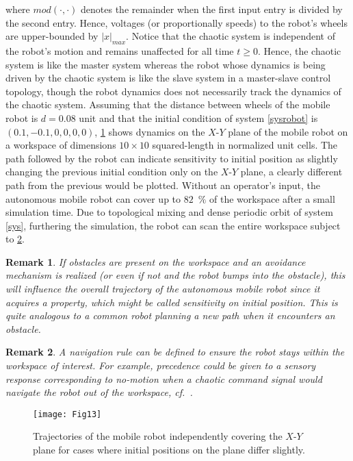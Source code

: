 \documentclass[final,5p,times,twocolumn]{elsarticle}
\newtheorem{remark}{Remark}
\begin{document}
where $mod(\cdot,\cdot)$ denotes the remainder when the first input entry is divided by the second entry. Hence, voltages (or proportionally speeds) to the robot's wheels are upper-bounded by $|x|_{max}$. Notice that the chaotic system is independent of the robot's motion and remains unaffected for all time $t\ge0$. Hence, the chaotic system is like the master system whereas the robot whose dynamics is being driven by the chaotic system is like the slave system in a master-slave control topology, though the robot dynamics does not necessarily track the dynamics of the chaotic system. Assuming that the distance between wheels of the mobile robot is $d=0.08$ unit and that the initial condition of system \eqref{sysrobot} is $(0.1,-0.1,0,0,0,0)$, \cref{robotpathA} shows dynamics on the $X$-$Y$ plane of the mobile robot on a workspace of dimensions $10\times10$ squared-length in normalized unit cells. The path followed by the robot can indicate sensitivity to initial position as slightly changing the previous initial condition only on the $X$-$Y$ plane, a clearly different path from the previous would be plotted. Without an operator's input, the autonomous mobile robot can cover up to $82\enspace\%$ of the workspace after a small simulation time. Due to topological mixing and dense periodic orbit of system \eqref{sys}, furthering the simulation, the robot can scan the entire workspace subject to \cref{remNavRule}.
\begin{remark}
	If obstacles are present on the workspace and an avoidance mechanism is realized (or even if not and the robot bumps into the obstacle), this will influence the overall trajectory of the autonomous mobile robot since it acquires a property, which might be called sensitivity on initial position. This is quite analogous to a common robot planning a new path when it encounters an obstacle. %
\end{remark}
\begin{remark}
	\label{remNavRule}
	A navigation rule can be defined to ensure the robot stays within the workspace of interest. For example, precedence could be given to a sensory response corresponding to \textit{no-motion} when a chaotic command signal would navigate the robot out of the workspace, cf.~\cite{moysis2020analysis}.
\end{remark}
\begin{figure}[htbp]
	\texttt{[image: Fig13]}
	\caption{Trajectories of the mobile robot independently covering the $X$-$Y$ plane for cases where initial positions on the plane differ slightly.}
	\label{robotpathA}
\end{figure}
\end{document}
